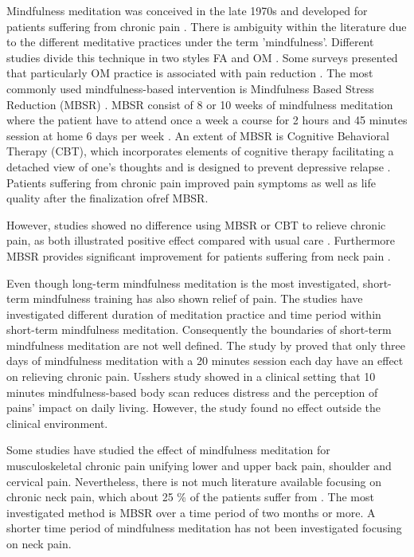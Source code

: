 Mindfulness meditation was conceived in the late 1970s and developed for patients suffering from chronic pain \cite{Chiesa2010}. There is ambiguity within the literature due to the different meditative practices under the term 'mindfulness'. Different studies divide this technique in two styles FA and OM \cite{Lutz2008, Zeidan2012}. Some surveys presented that particularly OM practice is associated with pain reduction \cite{Grant2009, Perlman2010}. The most commonly used mindfulness-based intervention is Mindfulness Based Stress Reduction (MBSR) \cite{Cramer2012}. MBSR consist of 8 or 10 weeks of mindfulness meditation where the patient have to attend once a week a course for 2 hours and 45 minutes session at home 6 days per week \cite{Kabat1982, Chiesa2010}. An extent of MBSR is Cognitive Behavioral Therapy (CBT), which incorporates elements of cognitive therapy facilitating a detached view of one's thoughts and is designed to prevent depressive relapse \cite{Chiesa2010}. Patients suffering from chronic pain improved pain symptoms as well as life quality after the finalization ofref MBSR. \cite{Zeidan2012} 

However, studies showed no difference using MBSR or CBT to relieve chronic pain, as both illustrated positive effect compared with usual care \cite{Jacob2016, Cherkin2016}. Furthermore MBSR provides significant improvement for patients suffering from neck pain \cite{Rosenzweig2010}.

Even though long-term mindfulness meditation is the most investigated, short-term mindfulness training has also shown relief of pain. The studies have investigated different duration of meditation practice and time period within short-term mindfulness meditation. Consequently the boundaries of short-term mindfulness meditation are not well defined. The study by \cite{Zeidan2012} proved that only three days of mindfulness meditation with a 20 minutes session each day have an effect on relieving chronic pain. Usshers study \cite{Ussher} showed in a clinical setting that 10 minutes mindfulness-based body scan reduces distress and the perception of pains’ impact on daily living. However, the study found no effect outside the clinical environment. \cite{Ussher2012} 

Some studies have studied the effect of mindfulness meditation for musculoskeletal chronic pain unifying lower and upper back pain, shoulder and cervical pain.\cite{Chiesa2010} Nevertheless, there is not much literature available focusing on chronic neck pain, which about 25 \% of the patients suffer from \cite{Macfarlanea2016}. The most investigated method is MBSR over a time period of two months or more. A shorter time period of mindfulness meditation has not been investigated focusing on neck pain.

